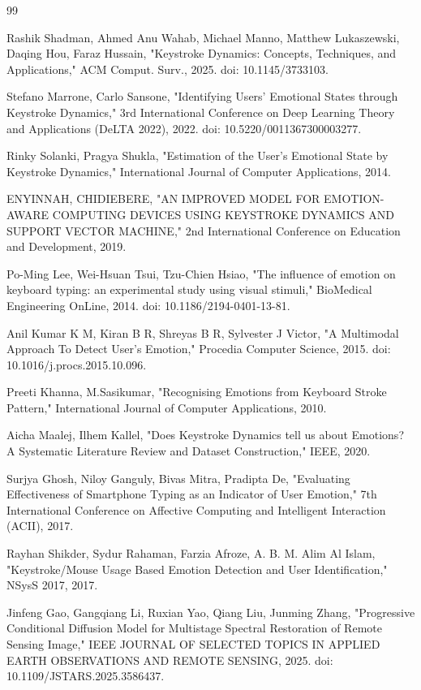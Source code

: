 \documentclass[conference]{IEEEtran}
\begin{document}
\begin{thebibliography}{99}

Rashik Shadman, Ahmed Anu Wahab, Michael Manno, Matthew Lukaszewski, Daqing Hou, Faraz Hussain, "Keystroke Dynamics: Concepts, Techniques, and Applications," ACM Comput. Surv., 2025. doi: 10.1145/3733103.

Stefano Marrone, Carlo Sansone, "Identifying Users' Emotional States through Keystroke Dynamics," 3rd International Conference on Deep Learning Theory and Applications (DeLTA 2022), 2022. doi: 10.5220/0011367300003277.

Rinky Solanki, Pragya Shukla, "Estimation of the User's Emotional State by Keystroke Dynamics," International Journal of Computer Applications, 2014.

ENYINNAH, CHIDIEBERE, "AN IMPROVED MODEL FOR EMOTION-AWARE COMPUTING DEVICES USING KEYSTROKE DYNAMICS AND SUPPORT VECTOR MACHINE," 2nd International Conference on Education and Development, 2019.

Po-Ming Lee, Wei-Hsuan Tsui, Tzu-Chien Hsiao, "The influence of emotion on keyboard typing: an experimental study using visual stimuli," BioMedical Engineering OnLine, 2014. doi: 10.1186/2194-0401-13-81.

Anil Kumar K M, Kiran B R, Shreyas B R, Sylvester J Victor, "A Multimodal Approach To Detect User's Emotion," Procedia Computer Science, 2015. doi: 10.1016/j.procs.2015.10.096.

Preeti Khanna, M.Sasikumar, "Recognising Emotions from Keyboard Stroke Pattern," International Journal of Computer Applications, 2010.

Aicha Maalej, Ilhem Kallel, "Does Keystroke Dynamics tell us about Emotions? A Systematic Literature Review and Dataset Construction," IEEE, 2020.

Surjya Ghosh, Niloy Ganguly, Bivas Mitra, Pradipta De, "Evaluating Effectiveness of Smartphone Typing as an Indicator of User Emotion," 7th International Conference on Affective Computing and Intelligent Interaction (ACII), 2017.

Rayhan Shikder, Sydur Rahaman, Farzia Afroze, A. B. M. Alim Al Islam, "Keystroke/Mouse Usage Based Emotion Detection and User Identification," NSysS 2017, 2017.

Jinfeng Gao, Gangqiang Li, Ruxian Yao, Qiang Liu, Junming Zhang, "Progressive Conditional Diffusion Model for Multistage Spectral Restoration of Remote Sensing Image," IEEE JOURNAL OF SELECTED TOPICS IN APPLIED EARTH OBSERVATIONS AND REMOTE SENSING, 2025. doi: 10.1109/JSTARS.2025.3586437.


\end{thebibliography}
\end{document}
